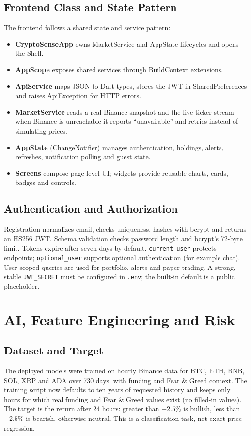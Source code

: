 \subsection{Frontend Class and State Pattern}
The frontend follows a shared state and service pattern:
\begin{itemize}
\item \textbf{CryptoSenseApp} owns MarketService and AppState lifecycles and opens the Shell.
\item \textbf{AppScope} exposes shared services through BuildContext extensions.
\item \textbf{ApiService} maps JSON to Dart types, stores the JWT in SharedPreferences and raises ApiException for HTTP errors.
\item \textbf{MarketService} reads a real Binance snapshot and the live ticker stream; when Binance is unreachable it reports ``unavailable'' and retries instead of simulating prices.
\item \textbf{AppState} (ChangeNotifier) manages authentication, holdings, alerts, refreshes, notification polling and guest state.
\item \textbf{Screens} compose page-level UI; widgets provide reusable charts, cards, badges and controls.
\end{itemize}

\subsection{Authentication and Authorization}
Registration normalizes email, checks uniqueness, hashes with bcrypt and returns an HS256 JWT. Schema validation checks password length and bcrypt's 72-byte limit. Tokens expire after seven days by default. \texttt{current\_user} protects endpoints; \texttt{optional\_user} supports optional authentication (for example chat). User-scoped queries are used for portfolio, alerts and paper trading. A strong, stable \texttt{JWT\_SECRET} must be configured in \texttt{.env}; the built-in default is a public placeholder.

\section{AI, Feature Engineering and Risk}
\subsection{Dataset and Target}
The deployed models were trained on hourly Binance data for BTC, ETH, BNB, SOL, XRP and ADA over 730 days, with funding and Fear \& Greed context. The training script now defaults to ten years of requested history and keeps only hours for which real funding and Fear \& Greed values exist (no filled-in values). The target is the return after 24 hours: greater than $+2.5\%$ is bullish, less than $-2.5\%$ is bearish, otherwise neutral. This is a classification task, not exact-price regression.


